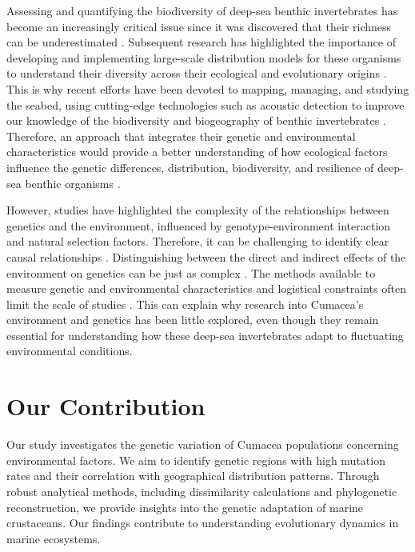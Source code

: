 Assessing and quantifying the biodiversity of deep-sea benthic invertebrates has become an increasingly critical issue since it was discovered that their richness can be underestimated \citep{grassle1992deep}. Subsequent research has highlighted the importance of developing and implementing large-scale distribution models for these organisms to understand their diversity across their ecological and evolutionary origins \citep{rex1997large}. This is why recent efforts have been devoted to mapping, managing, and studying the seabed, using cutting-edge technologies such as acoustic detection to improve our knowledge of the biodiversity and biogeography of benthic invertebrates \citep{brown2011benthic}. Therefore, an approach that integrates their genetic and environmental characteristics would provide a better understanding of how ecological factors influence the genetic differences, distribution, biodiversity, and resilience of deep-sea benthic organisms \citep{etter1990population, vrijenhoek2009cryptic}.

However, studies have highlighted the complexity of the relationships between genetics and the environment, influenced by genotype-environment interaction and natural selection factors. Therefore, it can be challenging to identify clear causal relationships \citep{balkenhol_identifying_2009}. Distinguishing between the direct and indirect effects of the environment on genetics can be just as complex  \citep{manel_perspectives_2010, balkenhol_landscape_2019}. The methods available to measure genetic and environmental characteristics and logistical constraints often limit the scale of studies \citep{manel_perspectives_2010, shafer_widespread_2013}. This can explain why research into Cumacea’s environment and genetics has been little explored, even though they remain essential for understanding how these deep-sea invertebrates adapt to fluctuating environmental conditions.

\section{Our Contribution}

Our study investigates the genetic variation of Cumacea populations concerning environmental factors. We aim to identify genetic regions with high mutation rates and their correlation with geographical distribution patterns. Through robust analytical methods, including dissimilarity calculations and phylogenetic reconstruction, we provide insights into the genetic adaptation of marine crustaceans. Our findings contribute to understanding evolutionary dynamics in marine ecosystems.

